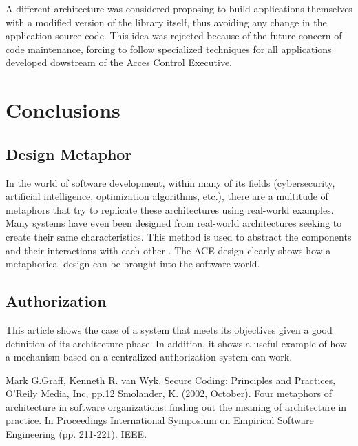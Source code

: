 \documentclass[conference]{IEEEtran}
\begin{document}
A different architecture was considered proposing to build applications themselves with a modified version of the library itself, thus avoiding any change in the application source code. This idea was rejected because of the future concern of code maintenance, forcing to follow specialized techniques for all applications developed dowstream of the Acces Control Executive.
 

\section{Conclusions}

\subsection{Design Metaphor}

In the world of software development, within many of its fields (cybersecurity, artificial intelligence, optimization algorithms, etc.), there are a multitude of metaphors that try to replicate these architectures using real-world examples. Many systems have even been designed from real-world architectures seeking to create their same characteristics. This method is used to abstract the components and their interactions with each other \cite{b2}. The ACE design clearly shows how a metaphorical design can be brought into the software world.

\subsection{Authorization}

This article shows the case of a system that meets its objectives given a good definition of its architecture phase. In addition, it shows a useful example of how a mechanism based on a centralized authorization system can work.



\begin{thebibliography}{00}
 Mark G.Graff, Kenneth R. van Wyk. Secure Coding: Principles and Practices, O'Reily Media, Inc, pp.12
 Smolander, K. (2002, October). Four metaphors of architecture in software organizations: finding out the meaning of architecture in practice. In Proceedings International Symposium on Empirical Software Engineering (pp. 211-221). IEEE.

\end{thebibliography}
\end{document}
